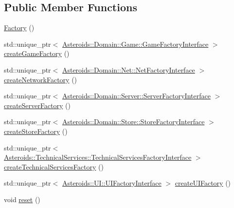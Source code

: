 \subsection*{Public Member Functions}
\begin{DoxyCompactItemize}
\item 
\hyperlink{classAsteroids_1_1Domain_1_1Factory_1_1Factory_a988bf74b46cff282611c6a52c6937a94}{Factory} ()
\item 
std\+::unique\+\_\+ptr$<$ \hyperlink{classAsteroids_1_1Domain_1_1Game_1_1GameFactoryInterface}{Asteroids\+::\+Domain\+::\+Game\+::\+Game\+Factory\+Interface} $>$ \hyperlink{classAsteroids_1_1Domain_1_1Factory_1_1Factory_a8029c274a6886b2aef3b31d1bd15da77}{create\+Game\+Factory} ()
\item 
std\+::unique\+\_\+ptr$<$ \hyperlink{classAsteroids_1_1Domain_1_1Net_1_1NetFactoryInterface}{Asteroids\+::\+Domain\+::\+Net\+::\+Net\+Factory\+Interface} $>$ \hyperlink{classAsteroids_1_1Domain_1_1Factory_1_1Factory_abde97e85ba71b218eed2e3ff534a7d56}{create\+Network\+Factory} ()
\item 
std\+::unique\+\_\+ptr$<$ \hyperlink{classAsteroids_1_1Domain_1_1Server_1_1ServerFactoryInterface}{Asteroids\+::\+Domain\+::\+Server\+::\+Server\+Factory\+Interface} $>$ \hyperlink{classAsteroids_1_1Domain_1_1Factory_1_1Factory_a7d3fd1dd5d6f0e44de2b4a57985b623b}{create\+Server\+Factory} ()
\item 
std\+::unique\+\_\+ptr$<$ \hyperlink{classAsteroids_1_1Domain_1_1Store_1_1StoreFactoryInterface}{Asteroids\+::\+Domain\+::\+Store\+::\+Store\+Factory\+Interface} $>$ \hyperlink{classAsteroids_1_1Domain_1_1Factory_1_1Factory_abc6cc7d441ceeca66671c79cff1e0c99}{create\+Store\+Factory} ()
\item 
std\+::unique\+\_\+ptr$<$ \hyperlink{classAsteroids_1_1TechnicalServices_1_1TechnicalServicesFactoryInterface}{Asteroids\+::\+Technical\+Services\+::\+Technical\+Services\+Factory\+Interface} $>$ \hyperlink{classAsteroids_1_1Domain_1_1Factory_1_1Factory_a8ea28b3c5b9c351eb49ac2f97786b7b1}{create\+Technical\+Services\+Factory} ()
\item 
std\+::unique\+\_\+ptr$<$ \hyperlink{classAsteroids_1_1UI_1_1UIFactoryInterface}{Asteroids\+::\+U\+I\+::\+U\+I\+Factory\+Interface} $>$ \hyperlink{classAsteroids_1_1Domain_1_1Factory_1_1Factory_acb69fddf282eda975e582394dde7e7f6}{create\+U\+I\+Factory} ()
\item 
void \hyperlink{classAsteroids_1_1Domain_1_1Factory_1_1Factory_adf3c63ebcd2022de789631e861f2aa15}{reset} ()
\end{DoxyCompactItemize}
